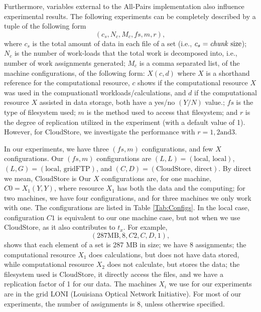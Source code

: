 \documentclass{rspublic}
\begin{document}
Furthermore, variables external to the All-Pairs implementation also
influence experimental results. The following experiments can be
completely described by a tuple of the following form
 \begin{equation}
(c_s, N_c, M_c, fs, m,r),
\label{Eq:tuple}
\end{equation}
where $c_s$ is the total amount of data in each file of a set (i.e.,
$c_s=\mbox{\textit{chunk} size}$); $N_c$ is the number of work-loads
that the total work is decomposed into, i.e., number of work
assignments generated; $M_c$ is a comma separated list, of the machine 
configurations, of the
following form: $X(c, d)$ where $X$ is a shorthand reference for the
computational resource, $c$ shows if the computational resource $X$
was used in the compuationatl workloads/calculations, and $d$ if the
computational resource $X$ assisted in data storage, both have a
yes/no $(Y/N)$ value.; $fs$ is the type of filesystem used; $m$ is the
method used to access that filesystem; and $r$ is the degree of
replication utilized in the experiment (with a default value of 1).
 However, for CloudStore, we investigate the performance with 
 $r = 1, 2 \mbox{and} 3$.

In our experiments, we have three $(fs, m)$ configurations, and few $X$ configurations. Our $(fs, m)$ configurations are $(L,L)=(\mbox{local, local})$, $(L,G)=(\mbox{local, gridFTP})$, and $(C,D)=(\mbox{CloudStore, direct})$. By direct we mean, CloudStore is  Our $X$ configurations are, for one machine, $C0=X_1(Y,Y)$, where resource $X_1$ has both the data and the computing; for two machines, we have four configurations, and for three machines we only work with one. The configurations are listed in Table \ref{Tab:Configs}. In the local case, configuration $C1$ is equivalent to our one machine case, but not when we use CloudStore, as it also contributes to $t_x$. For example, 
 \begin{equation}
(287 \mbox{MB}, 8, C2, C, D, 1),
\end{equation}
shows that each element of a set is 287 MB in size; we have 8 assignments;
 the computational resource $X_1$ does calculations, but does
not have data stored, while computational resource $X_2$ does not
calculate, but stores the data; the filesystem used is CloudStore, it
directly access the files, and we have a replication factor of 1 for our
data. The machines $X_i$ we use for our experiments are in the grid LONI (Louisiana Optical Network Initiative). For most of our experiments, the number of 
assignments is 8, unless otherwise specified.
\end{document}
